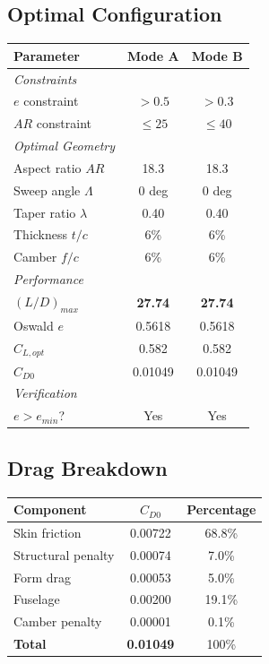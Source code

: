 \documentclass[11pt,a4paper]{article}
\begin{document}
\subsection{Optimal Configuration}

\begin{center}
\begin{tabular}{|l|c|c|}
\hline
Parameter & Mode A & Mode B \\
\hline
\textit{Constraints} & & \\
$e$ constraint & $> 0.5$ & $> 0.3$ \\
$AR$ constraint & $\leq 25$ & $\leq 40$ \\
\hline
\textit{Optimal Geometry} & & \\
Aspect ratio $AR$ & 18.3 & 18.3 \\
Sweep angle $\Lambda$ & 0 deg & 0 deg \\
Taper ratio $\lambda$ & 0.40 & 0.40 \\
Thickness $t/c$ & 6\% & 6\% \\
Camber $f/c$ & 6\% & 6\% \\
\hline
\textit{Performance} & & \\
$(L/D)_{max}$ & \textbf{27.74} & \textbf{27.74} \\
Oswald $e$ & 0.5618 & 0.5618 \\
$C_{L,opt}$ & 0.582 & 0.582 \\
$C_{D0}$ & 0.01049 & 0.01049 \\
\hline
\textit{Verification} & & \\
$e > e_{min}$? & Yes & Yes \\
\hline
\end{tabular}
\end{center}

\subsection{Drag Breakdown}

\begin{center}
\begin{tabular}{|l|c|c|}
\hline
Component & $C_{D0}$ & Percentage \\
\hline
Skin friction & 0.00722 & 68.8\% \\
Structural penalty & 0.00074 & 7.0\% \\
Form drag & 0.00053 & 5.0\% \\
Fuselage & 0.00200 & 19.1\% \\
Camber penalty & 0.00001 & 0.1\% \\
\hline
\textbf{Total} & \textbf{0.01049} & 100\% \\
\hline
\end{tabular}
\end{center}
\end{document}
